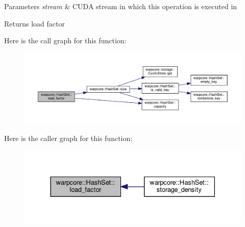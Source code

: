 \begin{DoxyParams}{Parameters}
{\em stream} & C\+U\+DA stream in which this operation is executed in \\
\hline
\end{DoxyParams}
\begin{DoxyReturn}{Returns}
load factor 
\end{DoxyReturn}
Here is the call graph for this function\+:
\nopagebreak
\begin{figure}[H]
\begin{center}
\leavevmode
\includegraphics[width=350pt]{classwarpcore_1_1HashSet_a986019ba68d32cd8270d34e106f12c9a_cgraph}
\end{center}
\end{figure}
Here is the caller graph for this function\+:
\nopagebreak
\begin{figure}[H]
\begin{center}
\leavevmode
\includegraphics[width=330pt]{classwarpcore_1_1HashSet_a986019ba68d32cd8270d34e106f12c9a_icgraph}
\end{center}
\end{figure}
\mbox{\label{classwarpcore_1_1HashSet_a15b81a16c6fbdb88dee1fd8c05a9fdbd}} 
